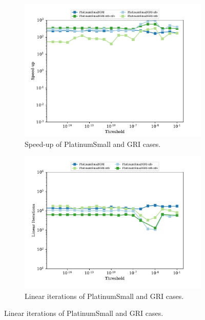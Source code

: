 \documentclass{article}
\begin{document}
\begin{figure}[htb]
    \centering
    \begin{subfigure}{0.49\textwidth}
        \centering
        \includegraphics[width=\textwidth]{figures/speedup-gri-small-network_combustor_exhaust.pdf}
        \caption{Speed-up of PlatinumSmall and GRI cases.}
        \label{fig:gri_small_su}
    \end{subfigure}
    \hfill
    \begin{subfigure}{0.49\textwidth}
        \centering
        \includegraphics[width=\textwidth]{figures/lin_iters_gri_small.pdf}
        \caption{Linear iterations of PlatinumSmall and GRI cases.}
        \label{fig:gri_small_cond}
    \end{subfigure}
    \hfill


\end{figure}
\end{document}
